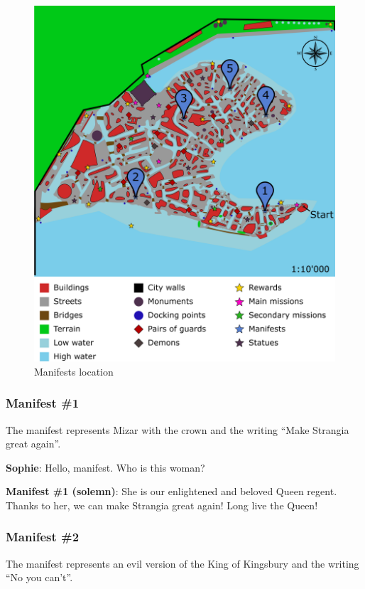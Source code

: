 \begin{figure}[H]
  \centering
  \includegraphics[width=\textwidth]{../Images/Maps/dynamiaSecondaryMissions_Manifests}
  \caption{Manifests location}
\end{figure}

\subsubsection*{Manifest \#{}1}
The manifest represents Mizar with the crown and the writing \enquote{Make Strangia great again}.

\textbf{Sophie}: Hello, manifest. Who is this woman?

\textbf{Manifest \#{}1 (solemn)}: She is our enlightened and beloved Queen regent. Thanks to her, we can make Strangia great again! Long live the Queen!

\subsubsection*{Manifest \#{}2}
The manifest represents an evil version of the King of Kingsbury and the writing \enquote{No you can't}.

